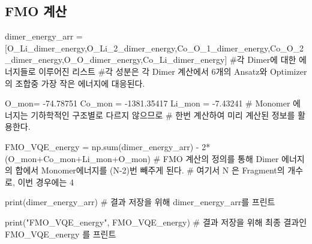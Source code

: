 \documentclass[11pt]{article}
\begin{document}
\subsection{FMO 계산}

\begin{CodeBox}[title={Example: Python snippet}]
dimer_energy_arr = [O_Li_dimer_energy,O_Li_2_dimer_energy,Co_O_1_dimer_energy,Co_O_2_dimer_energy,O_O_dimer_energy,Co_Li_dimer_energy]
#각 Dimer에 대한 에너지들로 이루어진 리스트
#각 성분은 각 Dimer 계산에서 6개의 Ansatz와 Optimizer의 조합중 가장 작은 에너지에 대응된다. 

O_mon= -74.78751
Co_mon = -1381.35417
Li_mon = -7.43241
# Monomer 에너지는 기하학적인 구조별로 다르지 않으므로 
# 한번 계산하여 미리 계산된 정보를 활용한다. 

FMO_VQE_energy = np.sum(dimer_energy_arr) - 2*(O_mon+Co_mon+Li_mon+O_mon)
# FMO 계산의 정의를 통해 Dimer 에너지의 합에서 Monomer에너지를 (N-2)번 빼주게 된다. 
# 여기서 N 은 Fragment의 개수로, 이번 경우에는 4

print(dimer_energy_arr)
# 결과 저장을 위해 dimer_energy_arr를 프린트

print("FMO_VQE_energy", FMO_VQE_energy)
# 결과 저장을 위해 최종 결과인 FMO_VQE_energy 를 프린트
\end{CodeBox} 
\end{document}

